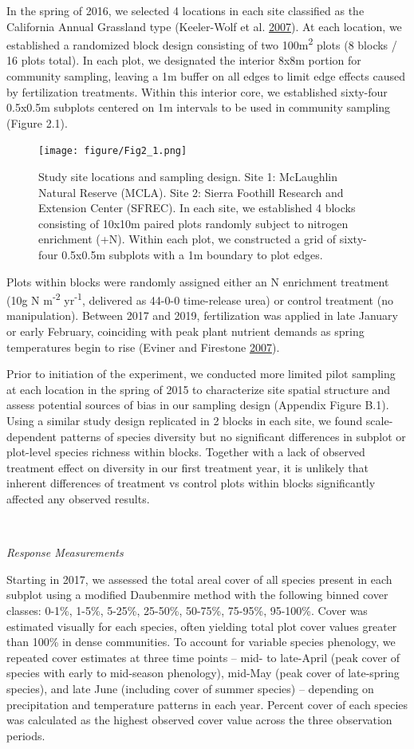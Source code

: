 \documentclass[twoside,12pt,final]{ucthesis-CA2012}
\begin{document}
\begin{ucmainmatter}
In the spring of 2016, we selected 4 locations in each site classified as the California Annual Grassland type (Keeler-Wolf et al. \protect\hyperlink{ref-keeler-wolf2007}{2007}). At each location, we established a randomized block design consisting of two 100m\textsuperscript{2} plots (8 blocks / 16 plots total). In each plot, we designated the interior 8x8m portion for community sampling, leaving a 1m buffer on all edges to limit edge effects caused by fertilization treatments. Within this interior core, we established sixty-four 0.5x0.5m subplots centered on 1m intervals to be used in community sampling (Figure 2.1).
\begin{figure}
\centering
\texttt{[image: figure/Fig2\_1.png]}
\caption{Study site locations and sampling design. Site 1: McLaughlin Natural Reserve (MCLA). Site 2: Sierra Foothill Research and Extension Center (SFREC). In each site, we established 4 blocks consisting of 10x10m paired plots randomly subject to nitrogen enrichment (+N). Within each plot, we constructed a grid of sixty-four 0.5x0.5m subplots with a 1m boundary to plot edges. \label{fig-2-1}}
\end{figure}
Plots within blocks were randomly assigned either an N enrichment treatment (10g N m\textsuperscript{-2} yr\textsuperscript{-1}, delivered as 44-0-0 time-release urea) or control treatment (no manipulation). Between 2017 and 2019, fertilization was applied in late January or early February, coinciding with peak plant nutrient demands as spring temperatures begin to rise (Eviner and Firestone \protect\hyperlink{ref-eviner2007}{2007}).

Prior to initiation of the experiment, we conducted more limited pilot sampling at each location in the spring of 2015 to characterize site spatial structure and assess potential sources of bias in our sampling design (Appendix Figure B.1). Using a similar study design replicated in 2 blocks in each site, we found scale-dependent patterns of species diversity but no significant differences in subplot or plot-level species richness within blocks. Together with a lack of observed treatment effect on diversity in our first treatment year, it is unlikely that inherent differences of treatment vs control plots within blocks significantly affected any observed results.

~

\emph{Response Measurements}

Starting in 2017, we assessed the total areal cover of all species present in each subplot using a modified Daubenmire method with the following binned cover classes: 0-1\%, 1-5\%, 5-25\%, 25-50\%, 50-75\%, 75-95\%, 95-100\%. Cover was estimated visually for each species, often yielding total plot cover values greater than 100\% in dense communities. To account for variable species phenology, we repeated cover estimates at three time points -- mid- to late-April (peak cover of species with early to mid-season phenology), mid-May (peak cover of late-spring species), and late June (including cover of summer species) -- depending on precipitation and temperature patterns in each year. Percent cover of each species was calculated as the highest observed cover value across the three observation periods.


\end{ucmainmatter}
\end{document}
